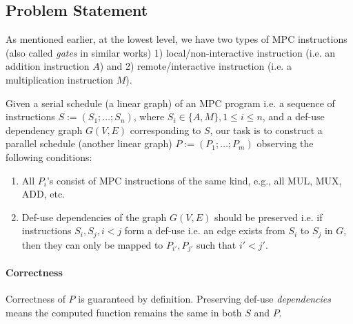 \subsection{Problem Statement}
\label{sec:problem}


As mentioned earlier, at the lowest level, we have two types of MPC instructions (also called \emph{gates} in similar works) 1) local/non-interactive instruction (i.e. an addition instruction $A$) and 2) remote/interactive instruction (i.e. a multiplication instruction $M$). %


Given a serial schedule (a linear graph) of an MPC program i.e. a sequence of instructions $S := (S_1; \dots; S_n)$, where $S_i \in \{A, M\}, 1 \leq i \leq n$, and a def-use dependency graph $G(V, E)$ corresponding to $S$, our task is to construct a parallel schedule (another linear graph) $P := (P_1; \dots; P_m)$ observing the following conditions:

\begin{enumerate}
    \item All $P_i$'s consist of MPC instructions of the same kind, e.g., all MUL, MUX, ADD, etc. 
    \item Def-use dependencies of the graph $G(V, E)$ should be preserved i.e. if instructions $S_i, S_j, i < j$ form a def-use i.e. an edge exists from $S_i$ to $S_j$ in $G$, then they can only be mapped to $P_{i'}, P_{j'}$ such that $i' < j'$.
\end{enumerate}

\paragraph{Correctness} Correctness of $P$ is guaranteed by definition. Preserving def-use \emph{dependencies} means the computed function remains the same in both $S$ and $P$.

